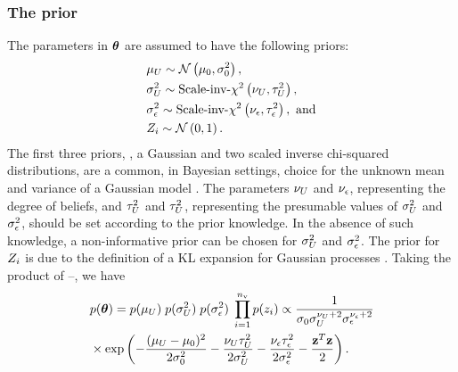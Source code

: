 \subsubsection{The prior}
The parameters in ${\boldsymbol\theta}$ are assumed to have the following priors:
\begin{align}
  & \mu_\U \sim \gaussian{\mu_0}{\sigma^2_0}, \elabel{mu-u-prior} \\
  & \sigma^2_\U \sim \sichisquared{\nu_\U}{\tau^2_\U}, \elabel{sigma2-u-prior} \\
  & \sigma^2_\noise \sim \sichisquared{\nu_\noise}{\tau^2_\noise}, \text{ and} \elabel{sigma2-noise-prior} \\
  & \Z_i \sim \gaussian{0}{1}. \elabel{z-prior}
\end{align}
The first three priors, \ie, a Gaussian and two scaled inverse chi-squared distributions, are a common, in Bayesian settings, choice for the unknown mean and variance of a Gaussian model \cite{gelman2004}. The parameters $\nu_U$ and $\nu_\epsilon$, representing the degree of beliefs, and $\tau^2_U$ and $\tau^2_U$, representing the presumable values of $\sigma^2_U$ and $\sigma^2_\epsilon$, should be set according to the prior knowledge. In the absence of such knowledge, a non-informative prior can be chosen for $\sigma^2_U$ and $\sigma^2_\epsilon$. The prior for $Z_i$ is due to the definition of a KL expansion for Gaussian processes \cite{marzouk2009}. Taking the product of --, we have
\begin{align}
  & \f{\vparam} = \f{\mu_\U} \; \f{\sigma^2_\U} \; \f{\sigma^2_\noise} \; \prod_{i = 1}^\nvars \f{\z_i} \propto \frac{1}{\sigma_0 \sigma_\U^{\nu_\U + 2} \sigma_\noise^{\nu_\noise + 2}} \nonumber \\
  & \times \exp\left( -\frac{(\mu_\U - \mu_0)^2}{2 \sigma^2_0} - \frac{\nu_\U \tau_\U^2}{2 \sigma^2_\U} - \frac{\nu_\noise \tau_\noise^2}{2 \sigma^2_\noise} - \frac{\vz^T\vz}{2} \right). \elabel{prior}
\end{align}

